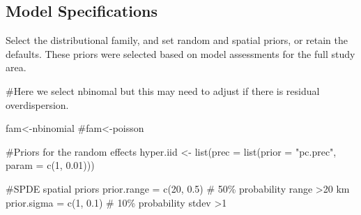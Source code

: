 \documentclass[
  letterpaper,
  DIV=11,
  numbers=noendperiod]{scrreprt}
\newenvironment{Shaded}{\begin{snugshade}}{\end{snugshade}}
\newcommand{\AttributeTok}[1]{\textcolor[rgb]{0.40,0.45,0.13}{#1}}
\newcommand{\CommentTok}[1]{\textcolor[rgb]{0.37,0.37,0.37}{#1}}
\newcommand{\DecValTok}[1]{\textcolor[rgb]{0.68,0.00,0.00}{#1}}
\newcommand{\FloatTok}[1]{\textcolor[rgb]{0.68,0.00,0.00}{#1}}
\newcommand{\FunctionTok}[1]{\textcolor[rgb]{0.28,0.35,0.67}{#1}}
\newcommand{\NormalTok}[1]{\textcolor[rgb]{0.00,0.23,0.31}{#1}}
\newcommand{\OtherTok}[1]{\textcolor[rgb]{0.00,0.23,0.31}{#1}}
\newcommand{\StringTok}[1]{\textcolor[rgb]{0.13,0.47,0.30}{#1}}
\begin{document}
\subsection{Model Specifications}\label{model-specifications}

Select the distributional family, and set random and spatial priors, or
retain the defaults. These priors were selected based on model
assessments for the full study area.

\begin{Shaded}
\begin{Highlighting}[]
\CommentTok{\#Here we select \textquotesingle{}nbinomal\textquotesingle{} but this may need to adjust if there is residual overdispersion. }

\NormalTok{fam}\OtherTok{\textless{}{-}}\StringTok{\textquotesingle{}nbinomial\textquotesingle{}}
\CommentTok{\#fam\textless{}{-}\textquotesingle{}poisson\textquotesingle{}}

\CommentTok{\#Priors for the random effects}
\NormalTok{hyper.iid }\OtherTok{\textless{}{-}} \FunctionTok{list}\NormalTok{(}\AttributeTok{prec =} \FunctionTok{list}\NormalTok{(}\AttributeTok{prior =} \StringTok{"pc.prec"}\NormalTok{, }\AttributeTok{param =} \FunctionTok{c}\NormalTok{(}\DecValTok{1}\NormalTok{, }\FloatTok{0.01}\NormalTok{)))}

\CommentTok{\#SPDE spatial priors}
\NormalTok{prior.range }\OtherTok{=} \FunctionTok{c}\NormalTok{(}\DecValTok{20}\NormalTok{, }\FloatTok{0.5}\NormalTok{)  }\CommentTok{\# 50\% probability range \textgreater{}20 km  }
\NormalTok{prior.sigma }\OtherTok{=} \FunctionTok{c}\NormalTok{(}\DecValTok{1}\NormalTok{, }\FloatTok{0.1}\NormalTok{)   }\CommentTok{\# 10\% probability stdev \textgreater{}1 }
\end{Highlighting}
\end{Shaded}
\end{document}
